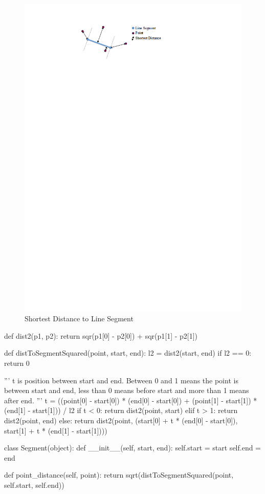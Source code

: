 \begin{figure}[ht]
 \centering
 \includegraphics[scale=0.85]{img/sprint3linesegment.png}
 \caption{Shortest Distance to Line Segment}
 \label{fig:sprint3-linesegment}
\end{figure}

\begin{code}[label={lst:sprint3-dist}, caption={Distance Between Point and Line Segment.}, language={Python}, style={PythonDoc}]
def dist2(p1, p2):
	return sqr(p1[0] - p2[0]) + sqr(p1[1] - p2[1])

def distToSegmentSquared(point, start, end):
	l2 = dist2(start, end)
	if l2 == 0:
		return 0

	'''
	t is position between start and end.
	Between 0 and 1 means the point is between start and end,
	less than 0 means before start and more than 1 means after end.
	'''
	t = ((point[0] - start[0]) * (end[0] - start[0]) + (point[1] - start[1]) * (end[1] - start[1])) / l2
	if t < 0:
		return dist2(point, start)
	elif t > 1:
		return dist2(point, end)
	else:
		return dist2(point, (start[0] + t * (end[0] - start[0]),
		                     start[1] + t * (end[1] - start[1])))

class Segment(object):
	def __init__(self, start, end):
		self.start = start
		self.end = end

	def point_distance(self, point):
		return sqrt(distToSegmentSquared(point, self.start, self.end))
\end{code}


